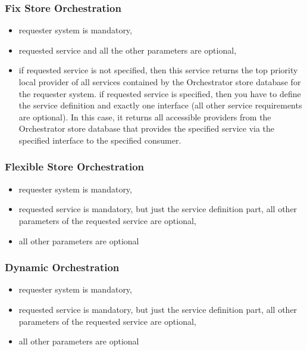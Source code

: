 \documentclass[a4paper]{arrowhead}
\begin{document}
\subsubsection{Fix Store Orchestration}

\begin{itemize}
    \item requester system is mandatory,
    \item requested service and all the other parameters are optional,
    \item if requested service is not specified, then this service returns the top priority local provider of all services contained by the Orchestrator store database for the requester system. if requested service is specified, then you have to define the service definition and exactly one interface (all other service requirements are optional). In this case, it returns all accessible providers from the Orchestrator store database that provides the specified service via the specified interface to the specified consumer.
\end{itemize}

\subsubsection{Flexible Store Orchestration}

\begin{itemize}
    \item requester system is mandatory,
    \item requested service is mandatory, but just the service definition part, all other parameters of the requested service are optional,
    \item all other parameters are optional
\end{itemize}    

\subsubsection{Dynamic Orchestration}

\begin{itemize}
    \item requester system is mandatory,
    \item requested service is mandatory, but just the service definition part, all other parameters of the requested service are optional,
    \item all other parameters are optional
\end{itemize}    
    
\end{document}
